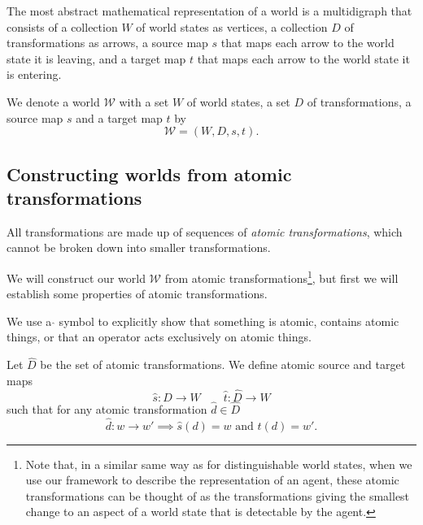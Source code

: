 \begin{postulate}
	The most abstract mathematical representation of a world is a multidigraph that consists of a collection $W$ of world states as vertices, a collection $D$ of transformations as arrows, a source map $s$ that maps each arrow to the world state it is leaving, and a target map $t$ that maps each arrow to the world state it is entering.
\end{postulate}

\begin{definition}
	We denote a world $\mathscr{W}$ with a set $W$ of world states, a set $D$ of transformations, a source map $s$ and a target map $t$ by
	\begin{equation}
		\mathscr{W} = (W, D, s, t).
	\end{equation}
\end{definition}

\subsection{Constructing worlds from atomic transformations}

\begin{postulate}
	All transformations are made up of sequences of \emph{atomic transformations}, which cannot be broken down into smaller transformations.
\end{postulate}

We will construct our world $\mathscr{W}$ from atomic transformations\footnote{
Note that, in a similar same way as for distinguishable world states, when we use our framework to describe the representation of an agent, these atomic transformations can be thought of as the transformations giving the smallest change to an aspect of a world state that is detectable by the agent.
}, but first we will establish some properties of atomic transformations.

\begin{definition}
	We use a $\hat{ }$ symbol to explicitly show that something is atomic, contains atomic things, or that an operator acts exclusively on atomic things.
\end{definition}

Let $\hat{D}$ be the set of atomic transformations.
We define atomic source and target maps
\begin{equation}
	\hat{s}: \hat{D} \to W \quad\quad \hat{t}: \hat{D} \to W
\end{equation}
such that for any atomic transformation $\hat{d} \in \hat{D}$
\begin{equation}
	\hat{d}: w \to w' \implies \hat{s}(d) = w \text{ and } \hat{t}(d) = w'.
\end{equation}

